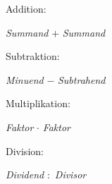 Addition:\par
{} \emph{Summand} $+$ \emph{Summand}\medskip

Subtraktion:\par
{} \emph{Minuend} $-$ \emph{Subtrahend}\medskip

Multiplikation:\par
{} \emph{Faktor} $\cdot$ \emph{Faktor}\medskip

Division:\par
{} \emph{Dividend} $:$ \emph{Divisor}\medskip

